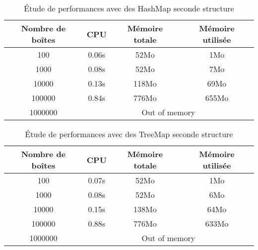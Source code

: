 
\begin{table}[h]
  \centering
\begin{tabular}{|c|c|c|c|}
\hline
Nombre de boîtes & CPU & Mémoire totale & Mémoire utilisée\\
\hline
100 & 0.06s & 52Mo & 1Mo\\
\hline
1000 & 0.08s & 52Mo & 7Mo\\
\hline
10000 & 0.13s & 118Mo & 69Mo\\
\hline
100000 & 0.84s & 776Mo & 655Mo\\
\hline
1000000 & \multicolumn{3}{|c|}{Out of memory}\\
\hline
\end{tabular}
\caption{Étude de performances avec des HashMap seconde structure}
\label{tab:hashmap3}
\end{table}



\begin{table}[h]
  \centering
\begin{tabular}{|c|c|c|c|}
\hline
Nombre de boîtes & CPU & Mémoire totale & Mémoire utilisée\\
\hline
100 & 0.07s & 52Mo & 1Mo\\
\hline
1000 & 0.08s & 52Mo & 6Mo\\
\hline
10000 & 0.15s & 138Mo & 64Mo\\
\hline
100000 & 0.88s & 776Mo & 633Mo\\
\hline
1000000 & \multicolumn{3}{|c|}{Out of memory}\\
\hline
\end{tabular}
\caption{Étude de performances avec des TreeMap seconde structure}
\label{tab:treemap2}
\end{table}

